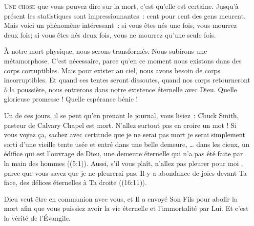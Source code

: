 \lettrine{U}{ne chose} que vous pouvez dire sur la mort,
 c'est qu'elle est certaine.
 Jusqu'à présent les statistiques sont impressionnantes~:
 cent pour cent des gens meurent. Mais voici un phénomène intéressant~:
 si vous êtes nés une fois, vous mourrez deux fois;
 si vous êtes nés deux fois, vous ne mourrez qu'une seule fois.

À notre mort physique, nous serons transformés.
 Nous subirons une métamorphose. C'est nécessaire, parce qu'en ce moment
 nous existons dans des corps corruptibles. Mais pour exister au ciel,
 nous avons besoin de corps incorruptibles. Et quand ces tentes
 seront dissoutes, quand nos corps retourneront à la poussière,
 nous entrerons dans notre existence éternelle avec Dieu.
 Quelle glorieuse promesse ! Quelle espérance bénie ! 


Un de ces jours, il se peut qu'en prenant le journal,
 vous lisiez~: 
 \Og Chuck Smith, pasteur de Calvary Chapel est mort. \Fg{}
 N'allez surtout pas en croire un mot ! Si vous voyez \c{c}a,
 sachez avec certitude que je ne serai pas mort \ocadr je serai simplement
 sorti d'une vieille tente usée et entré dans une belle demeure,
 \Og \dots{} 
 dans les cieux, un édifice qui est l'ouvrage de Dieu, une demeure éternelle
 qui n'a pas été faite par la main des hommes \Fg{} ((5:1)).
 Aussi, s'il vous plaît, n'allez pas pleurer pour moi
 , parce que vous savez que je ne pleurerai pas.
 \Og Il y a abondance de joies devant Ta face, des délices éternelles
 à Ta droite \Fg{} ((16:11)). 

Dieu veut être en communion avec vous, et Il a envoyé Son Fils pour abolir
 la mort afin que vous puissiez avoir la vie éternelle
 et l'immortalité par Lui. Et c'est la vérité de l'Évangile.

\dvrule






